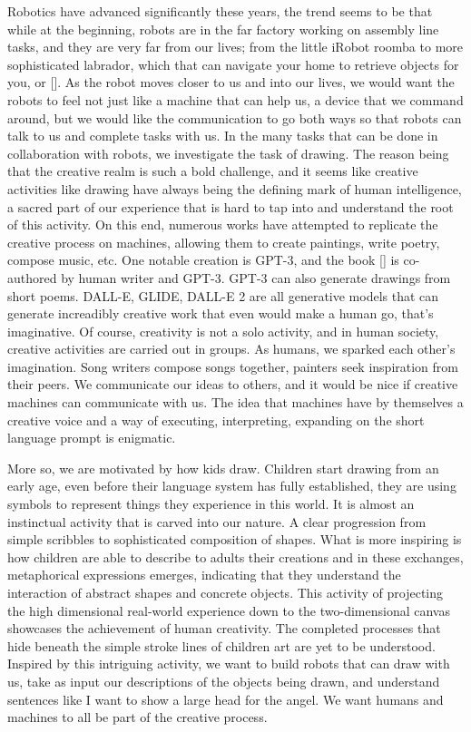 

Robotics have advanced significantly these years, the trend seems to be that while at the beginning, robots are in the far factory working on assembly line tasks, and they are very far from our lives; from the little iRobot roomba to more sophisticated labrador, which that can navigate your home to retrieve objects for you, or []. As the robot moves closer to us and into our lives, we would want the robots to feel not just like a machine that can help us, a device that we command around, but we would like the communication to go both ways so that robots can talk to us and complete tasks with us. In the many tasks that can be done in collaboration with robots, we investigate the task of drawing. The reason being that the creative realm is such a bold challenge, and it seems like creative activities like drawing have always being the defining mark of human intelligence, a sacred part of our experience that is hard to tap into and understand the root of this activity. On this end, numerous works have attempted to replicate the creative process on machines, allowing them to create paintings, write poetry, compose music, etc. One notable creation is GPT-3, and the book [] is co-authored by human writer and GPT-3. GPT-3 can also generate drawings from short poems. DALL-E, GLIDE, DALL-E 2 are all generative models that can generate increadibly creative work that even would make a human go, that's imaginative. Of course, creativity is not a solo activity, and in human society, creative activities are carried out in groups. As humans, we sparked each other's imagination. Song writers compose songs together, painters seek inspiration from their peers. We communicate our ideas to others, and it would be nice if creative machines can communicate with us. The idea that machines have by themselves a creative voice and a way of executing, interpreting, expanding on the short language prompt is enigmatic.  

More so, we are motivated by how kids draw. Children start drawing from an early age, even before their language system has fully established, they are using symbols to represent things they experience in this world. It is almost an instinctual activity that is carved into our nature. A clear progression from simple scribbles to sophisticated composition of shapes. What is more inspiring is how children are able to describe to adults their creations and in these exchanges, metaphorical expressions emerges, indicating that they understand the interaction of abstract shapes and concrete objects. This activity of projecting the high dimensional real-world experience down to the two-dimensional canvas showcases the achievement of human creativity. The completed processes that hide beneath the simple stroke lines of children art are yet to be understood. Inspired by this intriguing activity, we want to build robots that can draw with us, take as input our descriptions of the objects being drawn, and understand sentences like I want to show a large head for the angel. We want humans and machines to all be part of the creative process.   

